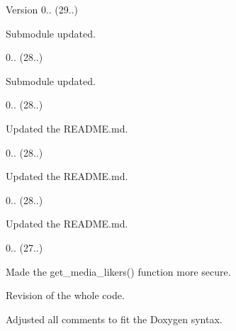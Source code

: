 \begin{DoxyVersion}{Version}
0.. (29..)
\begin{DoxyItemize}
\item Submodule updated. 
\end{DoxyItemize}

0.. (28..)
\begin{DoxyItemize}
\item Submodule updated. 
\end{DoxyItemize}

0.. (28..)
\begin{DoxyItemize}
\item Updated the R\+E\+A\+D\+M\+E.\+md. 
\end{DoxyItemize}

0.. (28..)
\begin{DoxyItemize}
\item Updated the R\+E\+A\+D\+M\+E.\+md. 
\end{DoxyItemize}

0.. (28..)
\begin{DoxyItemize}
\item Updated the R\+E\+A\+D\+M\+E.\+md. 
\end{DoxyItemize}

0.. (27..)
\begin{DoxyItemize}
\item Made the get\+\_\+media\+\_\+likers() function more secure.
\item Revision of the whole code.
\item Adjusted all comments to fit the Doxygen syntax. 
\end{DoxyItemize}
\end{DoxyVersion}
